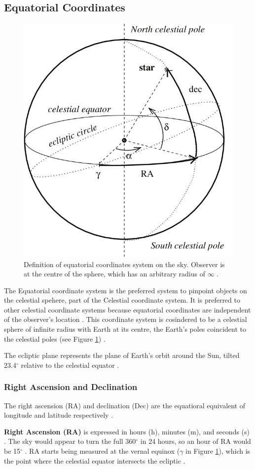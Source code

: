 \documentclass[12pt]{article}
\begin{document}
\subsection{Equatorial Coordinates}

\begin{figure}[hb]
    \centering
    \includegraphics[width=.5\textwidth]{equatorial coords.png}
    \caption{Definition of equatorial coordinates system on the sky. Observer is at the centre of the sphere, which has an arbitrary radius of $\infty$ \protect\cite{equatorialcoords}.}
    \label{fig:1}
\end{figure}

The Equatorial coordinate system is the preferred system to pinpoint objects on the celestial spehere, part of the Celestial coordinate system. It is preferred to other celestial coordinate systems because equatorial coordinates are independent of the observer's location \cite{eqcoord1}.
This coordinate system is cosindered to be a celestial sphere of infinite radius with Earth at its centre, the Earth's poles coincident to the celestial poles (see Figure \ref{fig:1}) \cite{doody2001basics}.

The ecliptic plane represents the plane of Earth's orbit around the Sun, tilted 23.4$^{\circ}$ relative to the celestial equator \cite{doody2001basics}.

\subsubsection{Right Ascension and Declination}

The right ascension (RA) and declination (Dec) are the equatioral equivalent of longitude and latitude respectively \cite{eqcoord1,doody2001basics}.

\textbf{Right Ascension (RA)} is expressed in hours (h), minutes (m), and seconds (s) \cite{doody2001basics}. The sky would appear to turn the full 360$^{\circ}$ in 24 hours, so an hour of RA would be 15$^{\circ}$ \cite{doody2001basics}. RA starts being measured at the vernal equinox ($\gamma$ in Figure \ref{fig:1}),
which is the point where the celestial equator intersects the ecliptic \cite{eqcoord1}.
\end{document}
